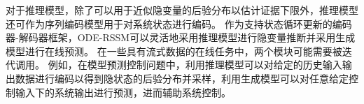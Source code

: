 对于推理模型，除了可以用于近似隐变量的后验分布以估计证据下限外，推理模型还可作为序列编码模型用于对系统状态进行编码。
作为支持状态循环更新的编码器-解码器框架，ODE-RSSM可以灵活地采用推理模型进行隐变量推断并采用生成模型进行在线预测。
在一些具有流式数据的在线任务中，两个模块可能需要被迭代调用。
例如，在模型预测控制问题中，利用推理模型可以对给定的历史输入输出数据进行编码以得到隐状态的后验分布并采样，利用生成模型可以对任意给定控制输入下的系统输出进行预测，进而辅助系统控制。








